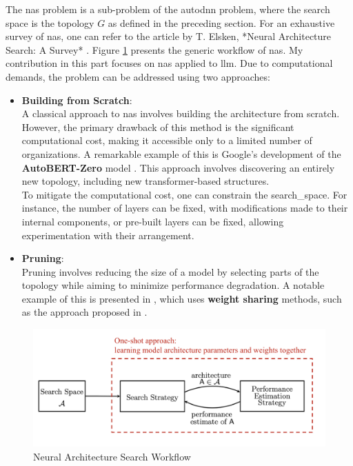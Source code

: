 The \acrshort{nas} problem is a sub-problem of the \acrshort{autodnn} problem, where the search space is the topology \( G \) as defined in the preceding section. For an exhaustive survey of \acrshort{nas}, one can refer to the article by T. Elsken, *Neural Architecture Search: A Survey* \cite{elsken_neural_2019}. Figure \ref{fig:nas} presents the generic workflow of \acrshort{nas}. My contribution in this part focuses on \acrshort{nas} applied to \acrshort{llm}. Due to computational demands, the problem can be addressed using two approaches:

\begin{itemize}
    

    \item \textbf{Building from Scratch}:\\
    A classical approach to \acrshort{nas} involves building the architecture from scratch. However, the primary drawback of this method is the significant computational cost, making it accessible only to a limited number of organizations. A remarkable example of this is Google's development of the \textbf{AutoBERT-Zero} model \cite{gao_autobert-zero_2022}. This approach involves discovering an entirely new topology, including new transformer-based structures.\\
    To mitigate the computational cost, one can constrain the \gls{search_space}. For instance, the number of layers can be fixed, with modifications made to their internal components, or pre-built layers can be fixed, allowing experimentation with their arrangement.

    \item \textbf{Pruning}:\\
    Pruning involves reducing the size of a model by selecting parts of the topology while aiming to minimize performance degradation. A notable example of this is presented in \cite{klein_structural_2023}, which uses \textbf{weight sharing} methods, such as the approach proposed in \cite{pham_efficient_2018}.
\end{itemize}

\begin{figure}
    \centering
    \includegraphics[width=0.6\linewidth]{assets/img/chap_2/NAS-high-level.png}
    \caption{Neural Architecture Search Workflow}
    \label{fig:nas}
\end{figure}


